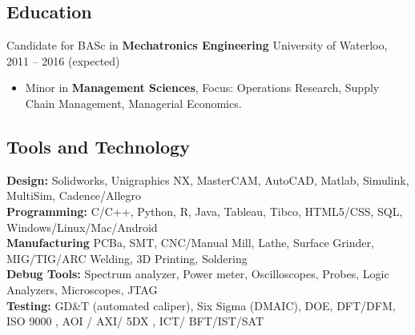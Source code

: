 \documentclass[pdftex,11pt,letterpaper]{article}
\begin{document}
\subsection*{Education}
Candidate for BASc in \textbf{Mechatronics Engineering} \hfill {\color{gray} University of Waterloo, 2011 -- 2016 (expected)}
\begin{itemize}
  \item Minor in \textbf{Management Sciences}, Focus: Operations Research, Supply Chain Management, Managerial Economics.
\end{itemize}

\subsection*{Tools and Technology}
\textbf{Design:} Solidworks, Unigraphics NX, MasterCAM, AutoCAD, Matlab, Simulink, MultiSim, Cadence/Allegro \\
\textbf{Programming:} C/C++, Python, R, Java, Tableau, Tibco, HTML5/CSS, SQL, Windows/Linux/Mac/Android\\
\textbf{Manufacturing} PCBa, SMT, CNC/Manual Mill, Lathe, Surface Grinder, MIG/TIG/ARC Welding, 3D Printing, Soldering \\
\textbf{Debug Tools:} Spectrum analyzer, Power meter, Oscilloscopes, Probes, Logic Analyzers, Microscopes, JTAG\\
\textbf{Testing:} GD\&T (automated caliper), Six Sigma (DMAIC), DOE, DFT/DFM, ISO 9000 , AOI / AXI/ 5DX , ICT/ BFT/IST/SAT
\end{document}
